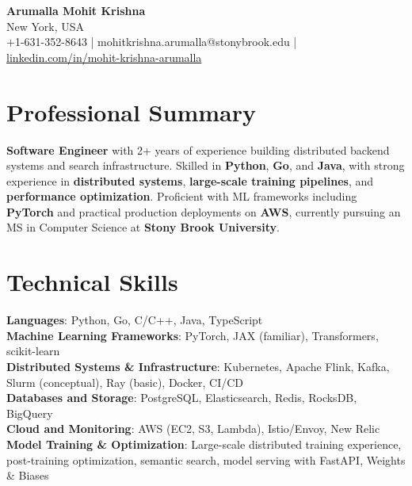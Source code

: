\documentclass[letterpaper,11pt]{article}
\begin{document}
\begin{center}
  {\Large \textbf{Arumalla Mohit Krishna}} \\
  New York, USA \\
  +1-631-352-8643 \enspace | \enspace mohitkrishna.arumalla@stonybrook.edu \enspace | \enspace \href{https://www.linkedin.com/in/mohit-krishna-arumalla}{linkedin.com/in/mohit-krishna-arumalla}
\end{center}

\section{Professional Summary}
  \begin{itemize}[leftmargin=0.15in, label={}]
    \small{\item{
     \textbf{Software Engineer} with 2+ years of experience building distributed backend systems and search infrastructure. Skilled in \textbf{Python}, \textbf{Go}, and \textbf{Java}, with strong experience in \textbf{distributed systems}, \textbf{large-scale training pipelines}, and \textbf{performance optimization}. Proficient with ML frameworks including \textbf{PyTorch} and practical production deployments on \textbf{AWS}, currently pursuing an MS in Computer Science at \textbf{Stony Brook University}.
    }}
  \end{itemize}
\vspace{-16pt}

\section{Technical Skills}
 \begin{itemize}[leftmargin=0.15in, label={}]
    \small{\item{
     \textbf{Languages}: Python, Go, C/C++, Java, TypeScript \\
     \textbf{Machine Learning Frameworks}: PyTorch, JAX (familiar), Transformers, scikit-learn \\
     \textbf{Distributed Systems \& Infrastructure}: Kubernetes, Apache Flink, Kafka, Slurm (conceptual), Ray (basic), Docker, CI/CD \\
     \textbf{Databases and Storage}: PostgreSQL, Elasticsearch, Redis, RocksDB, BigQuery \\
     \textbf{Cloud and Monitoring}: AWS (EC2, S3, Lambda), Istio/Envoy, New Relic \\
     \textbf{Model Training \& Optimization}: Large-scale distributed training experience, post-training optimization, semantic search, model serving with FastAPI, Weights \& Biases
    }}
 \end{itemize}
\vspace{-16pt}
\end{document}
